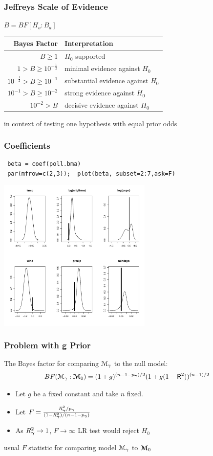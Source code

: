 \documentclass[handout]{beamer}
\begin{document}
\begin{frame}
\frametitle{Jeffreys Scale of Evidence}

$B = BF[H_o : B_a]$

\begin{tabular}{|r|l|} \hline \hline
Bayes Factor & Interpretation \\ \hline
$B \geq 1$ & $H_0$ supported \\
$1 > B \geq 10^{-\frac{1}{2}} $ & minimal evidence against $H_0$ \\
$ 10^{- \frac{1}{2}} > B  \geq 10^{-1}$ & substantial evidence against $H_0$ \\
$ 10^{-1} > B  \geq 10^{-2}$ & strong evidence against $H_0$ \\
$ 10^{-2} > B $ & decisive evidence against $H_0$ \\ \hline \hline
\end{tabular}

in context of testing one hypothesis with equal prior odds
\end{frame}


\begin{frame}[fragile]
\frametitle{Coefficients}
\begin{verbatim}
 beta = coef(poll.bma)
 par(mfrow=c(2,3));  plot(beta, subset=2:7,ask=F)
\end{verbatim}
\centering
\includegraphics[height=3in]{poll-beta}  

\end{frame}

\begin{frame}
  \frametitle{Problem with g Prior}
The Bayes factor for comparing ${\cal M}_\gamma$ to the null
model:
$$
 BF({\cal M}_\gamma : \boldsymbol{{\cal M}}_0) =    (1 + g)^{(n - 1 - p_{\boldsymbol{\gamma}})/2} (1 + g(1 - \textsf{R}^2))^{(n-1)/2}
$$

\begin{itemize}
\item Let $g$ be a fixed constant and take $n$ fixed. 
\item Let $F = \frac{R_{\boldsymbol{\gamma}}^2/p_{\boldsymbol{\gamma}}}{(1 - R_{\boldsymbol{\gamma}}^2)/(n - 1 - p_{\boldsymbol{\gamma}})}$
\item As $R^2_{\boldsymbol{\gamma}} \to 1$, $F \to \infty$ LR test would reject $H_0$
\end{itemize}


usual $F$ statistic for  comparing model ${\cal M}_\gamma$ to $\boldsymbol{{\cal M}}_0$

\end{frame}
\end{document}
